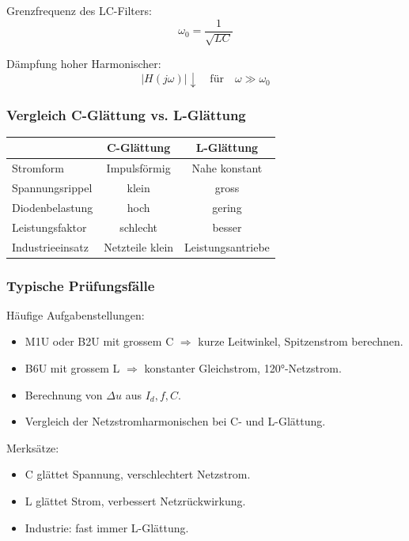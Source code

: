Grenzfrequenz des LC-Filters:
\[
\boxed{\omega_0 = \frac{1}{\sqrt{LC}}}
\]

Dämpfung hoher Harmonischer:
\[
|H(j\omega)| \downarrow \quad \text{für} \quad \omega \gg \omega_0
\]

\subsubsection{Vergleich C-Glättung vs. L-Glättung}

\begin{center}
\begin{tabular}{l|c|c}
 & C-Glättung & L-Glättung \\
\hline
Stromform & Impulsförmig & Nahe konstant \\
Spannungsrippel & klein & gross \\
Diodenbelastung & hoch & gering \\
Leistungsfaktor & schlecht & besser \\
Industrieeinsatz & Netzteile klein & Leistungsantriebe \\
\end{tabular}
\end{center}

\subsubsection{Typische Prüfungsfälle}

Häufige Aufgabenstellungen:
\begin{itemize}
\item M1U oder B2U mit grossem C $\Rightarrow$ kurze Leitwinkel, Spitzenstrom berechnen.
\item B6U mit grossem L $\Rightarrow$ konstanter Gleichstrom, 120°-Netzstrom.
\item Berechnung von $\Delta u$ aus $I_d, f, C$.
\item Vergleich der Netzstromharmonischen bei C- und L-Glättung.
\end{itemize}

Merksätze:
\begin{itemize}
\item C glättet Spannung, verschlechtert Netzstrom.
\item L glättet Strom, verbessert Netzrückwirkung.
\item Industrie: fast immer L-Glättung.
\end{itemize}
